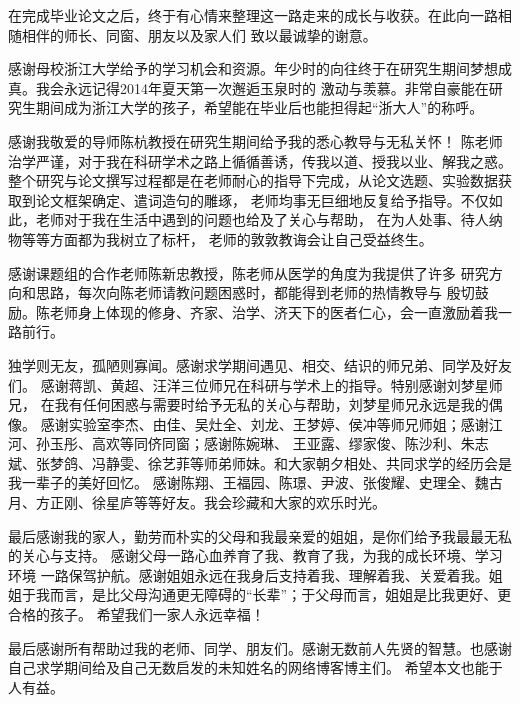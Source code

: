 \cleardoublepage
{}

在完成毕业论文之后，终于有心情来整理这一路走来的成长与收获。在此向一路相随相伴的师长、同窗、朋友以及家人们
致以最诚挚的谢意。

感谢母校浙江大学给予的学习机会和资源。年少时的向往终于在研究生期间梦想成真。我会永远记得2014年夏天第一次邂逅玉泉时的
激动与羡慕。非常自豪能在研究生期间成为浙江大学的孩子，希望能在毕业后也能担得起“浙大人”的称呼。

感谢我敬爱的导师陈杭教授在研究生期间给予我的悉心教导与无私关怀！
陈老师治学严谨，对于我在科研学术之路上循循善诱，传我以道、授我以业、解我之惑。
整个研究与论文撰写过程都是在老师耐心的指导下完成，从论文选题、实验数据获取到论文框架确定、遣词造句的雕琢，
老师均事无巨细地反复给予指导。不仅如此，老师对于我在生活中遇到的问题也给及了关心与帮助，
在为人处事、待人纳物等等方面都为我树立了标杆，
老师的敦敦教诲会让自己受益终生。


感谢课题组的合作老师陈新忠教授，陈老师从医学的角度为我提供了许多
研究方向和思路，每次向陈老师请教问题困惑时，都能得到老师的热情教导与
殷切鼓励。陈老师身上体现的修身、齐家、治学、济天下的医者仁心，会一直激励着我一路前行。

独学则无友，孤陋则寡闻。感谢求学期间遇见、相交、结识的师兄弟、同学及好友们。
感谢蒋凯、黄超、汪洋三位师兄在科研与学术上的指导。特别感谢刘梦星师兄，
在我有任何困惑与需要时给予无私的关心与帮助，刘梦星师兄永远是我的偶像。
感谢实验室李杰、由佳、吴灶全、刘龙、王梦婷、侯冲等师兄师姐；感谢江河、孙玉彤、高欢等同侪同窗；感谢陈婉琳、
王亚露、缪家俊、陈沙利、朱志斌、张梦鸽、冯静雯、徐艺菲等师弟师妹。和大家朝夕相处、共同求学的经历会是我一辈子的美好回忆。
感谢陈翔、王福园、陈璟、尹波、张俊耀、史理全、魏古月、方正刚、徐星庐等等好友。我会珍藏和大家的欢乐时光。


最后感谢我的家人，勤劳而朴实的父母和我最亲爱的姐姐，是你们给予我最最无私的关心与支持。
感谢父母一路心血养育了我、教育了我，为我的成长环境、学习环境
一路保驾护航。感谢姐姐永远在我身后支持着我、理解着我、关爱着我。姐姐于我而言，是比父母沟通更无障碍的“长辈”；于父母而言，姐姐是比我更好、更合格的孩子。
希望我们一家人永远幸福！

最后感谢所有帮助过我的老师、同学、朋友们。感谢无数前人先贤的智慧。也感谢自己求学期间给及自己无数启发的未知姓名的网络博客博主们。
希望本文也能于人有益。


